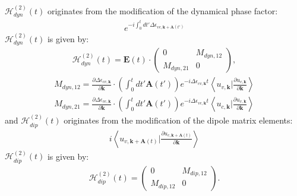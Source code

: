  $\mathcal{H}^{(2)}_{dyn}(t)$ originates from the modification of the dynamical phase factor:
\begin{align}
e^{-i\int^t_0dt' \Delta \epsilon_{vc,\mathbf k+ \mathbf A(t')}}  
\end{align}
$\mathcal{H}^{(2)}_{dyn}(t)$ is given by:
\begin{align}
\mathcal{H}^{(2)}_{dyn}(t) =   \mathbf E(t)\cdot 
\left(
    \begin{array}{cc}
        0 &  M_{dyn,12}\\
        M_{dyn,21} & 0
    \end{array}
    \right),
\end{align}
\begin{align}
    M_{dyn,12}=  \frac{\partial \Delta \epsilon_{cv,\mathbf k}}{\partial \mathbf k}\cdot \left ( \int^t_0 dt' \mathbf A(t') \right )e^{-i \Delta \epsilon_{cv,\mathbf k}t} 
  \left \langle u_{v,\mathbf k}\Big |\frac{\partial u_{c,\mathbf k}}{\partial \mathbf k} \right \rangle \\
  M_{dyn,21}= \frac{\partial \Delta \epsilon_{vc,\mathbf k}}{\partial \mathbf k} \cdot \left ( \int^t_0dt' \mathbf A(t')\right )e^{-i\Delta \epsilon_{vc,\mathbf k}t}
  \left \langle u_{c,\mathbf k}\Big |\frac{\partial u_{v,\mathbf k}}{\partial \mathbf k} \right \rangle 
\end{align}
and $\mathcal{H}^{(2)}_{dip}(t)$ originates from the modification of the dipole matrix elements:
\begin{align}
i\left \langle u_{v,\mathbf k+\mathbf A(t)}\Big |\frac{\partial u_{c,\mathbf k+\mathbf A(t)}}{\partial \mathbf k} \right \rangle    
\end{align}
$\mathcal{H}^{(2)}_{dip}(t)$ is given by:
\begin{align}
\mathcal{H}^{(2)}_{dip}(t) =  
\left(
    \begin{array}{cc}
        0 & M_{dip,12}\\
        M_{dip,12} & 0
    \end{array}
    \right).
\end{align}

